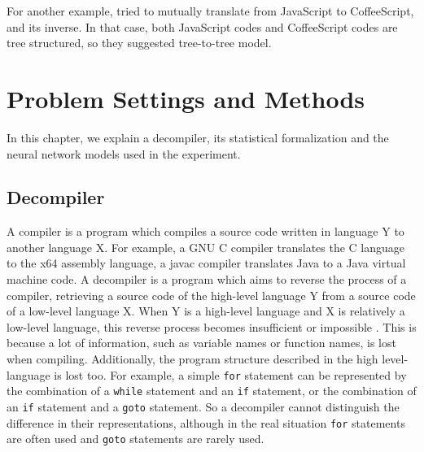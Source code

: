 \documentclass[11pt]{jarticle}
\begin{document}
For another example, \citet{coffeescript_to_javascript} tried to mutually translate from JavaScript to CoffeeScript, and its inverse.
In that case, both JavaScript codes and CoffeeScript codes are tree structured, so they suggested tree-to-tree model.


\chapter{Problem Settings and Methods}

In this chapter, we explain a decompiler, its statistical formalization and 
the neural network models used in the experiment.
\section{Decompiler}


A compiler is a program which compiles a source code written in language Y to another language X. 
For example, a GNU C compiler translates the C language to the x64 assembly language, a javac compiler translates Java to a Java virtual machine code.
A decompiler is a program which aims to reverse the process of a compiler, retrieving a source code of the high-level language Y from a source code of a low-level language X. 
When Y is a high-level language and X is relatively a low-level language, 
this reverse process becomes insufficient or impossible
\citep{hex_rays,decompile_hard_java}.
This is because a lot of information, such as variable names or function names, is lost when compiling.
Additionally, the program structure described in the high level-language is lost too. 
For example, a simple \texttt{for} statement can be represented by the combination of a \texttt{while} statement and an \texttt{if} statement, or the combination of an \texttt{if} statement and a \texttt{goto} statement. 
So a decompiler cannot distinguish the difference in their representations, 
although in the real situation \texttt{for} statements are often used and \texttt{goto} statements are rarely used.



\end{document}
